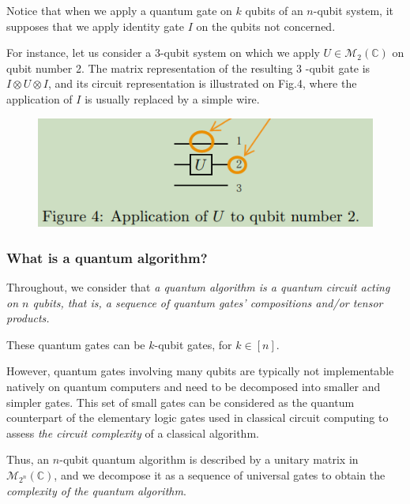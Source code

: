 Notice that when we apply a quantum gate on $k$ qubits of an $n$-qubit system, it supposes that we apply identity gate $I$ on the qubits not concerned. 

\begin{example}
For instance, let us consider a 3-qubit system on which we apply $U \in \mathcal{M}_{2}(\mathbb{C})$ on qubit number 2. The matrix representation of the resulting 3 -qubit gate is $I \otimes U \otimes I$, and its circuit representation is illustrated on Fig.4, where the application of $I$ is usually replaced by a simple wire.
    \begin{figure}
    \centering
    \includegraphics[width=0.5\linewidth]{grange2023-3.png}
\end{figure}
\end{example}

\subsubsection{What is a quantum algorithm?}

Throughout, we consider that \textit{a quantum algorithm is a quantum circuit acting on $n$ qubits, that is, a sequence of quantum gates' compositions and/or tensor products. } %

These quantum gates can be $k$-qubit gates, for $k \in[n]$. %

However, quantum gates involving many qubits are typically not implementable natively on quantum computers and need to be decomposed into smaller and simpler gates. This set of small gates can be considered as the quantum counterpart of the elementary logic gates used in classical circuit computing to assess \textit{the circuit complexity} of a classical algorithm. %

Thus, an $n$-qubit quantum algorithm is described by a unitary matrix in $\mathcal{M}_{2^{n}}(\mathbb{C})$, and we decompose it as a sequence of universal gates to obtain the \textit{complexity of the quantum algorithm}. %

